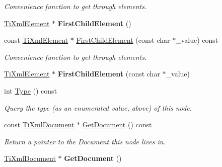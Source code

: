 \begin{DoxyCompactItemize}
\begin{DoxyCompactList}\small\item\em Convenience function to get through elements. \end{DoxyCompactList}\item 
\hyperlink{class_ti_xml_element}{Ti\+Xml\+Element} $\ast$ {\bfseries First\+Child\+Element} ()\hypertarget{class_ti_xml_node_aa0fecff1f3866ab33a8a25506e95db1d}{}\label{class_ti_xml_node_aa0fecff1f3866ab33a8a25506e95db1d}

\item 
const \hyperlink{class_ti_xml_element}{Ti\+Xml\+Element} $\ast$ \hyperlink{class_ti_xml_node_a0ec361bfef1cf1978d060295f597e0d9}{First\+Child\+Element} (const char $\ast$\+\_\+value) const \hypertarget{class_ti_xml_node_a0ec361bfef1cf1978d060295f597e0d9}{}\label{class_ti_xml_node_a0ec361bfef1cf1978d060295f597e0d9}

\begin{DoxyCompactList}\small\item\em Convenience function to get through elements. \end{DoxyCompactList}\item 
\hyperlink{class_ti_xml_element}{Ti\+Xml\+Element} $\ast$ {\bfseries First\+Child\+Element} (const char $\ast$\+\_\+value)\hypertarget{class_ti_xml_node_a6936ae323675071808ac4840379e57f5}{}\label{class_ti_xml_node_a6936ae323675071808ac4840379e57f5}

\item 
int \hyperlink{class_ti_xml_node_a57b99d5c97d67a42b9752f5210a1ba5e}{Type} () const 
\begin{DoxyCompactList}\small\item\em Query the type (as an enumerated value, above) of this node. \end{DoxyCompactList}\item 
const \hyperlink{class_ti_xml_document}{Ti\+Xml\+Document} $\ast$ \hyperlink{class_ti_xml_node_aa66f4ebcd175204a168ed7c2d7b43071}{Get\+Document} () const 
\begin{DoxyCompactList}\small\item\em Return a pointer to the Document this node lives in. \end{DoxyCompactList}\item 
\hyperlink{class_ti_xml_document}{Ti\+Xml\+Document} $\ast$ {\bfseries Get\+Document} ()\hypertarget{class_ti_xml_node_a7b2372c0e7adfb32f5b6902fe49a39b2}{}\label{class_ti_xml_node_a7b2372c0e7adfb32f5b6902fe49a39b2}


\end{DoxyCompactItemize}
